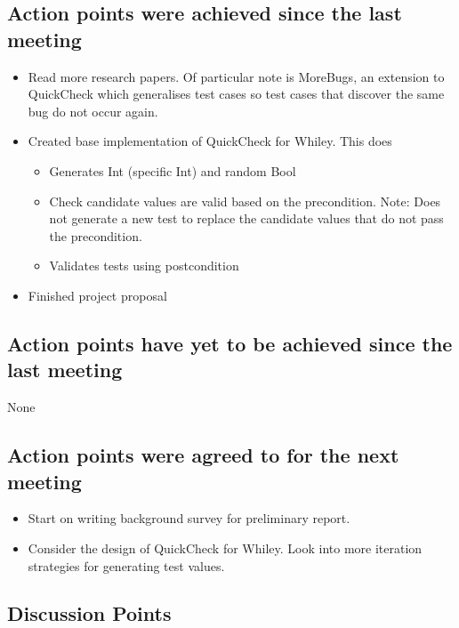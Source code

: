 \documentclass[]{article}
\begin{document}
\subsection{Action points were achieved since the last meeting}
\begin{itemize}
	\item Read more research papers. Of particular note is MoreBugs, an extension to QuickCheck which generalises test cases so test cases that discover the same bug do not occur again.
	\item Created base implementation of QuickCheck for Whiley. This does
	\begin{itemize}
		\item Generates Int (specific Int) and random Bool
		\item Check candidate values are valid based on the precondition. Note: Does not generate a new test to replace the candidate values that do not pass the precondition.
		\item Validates tests using postcondition
	\end{itemize}
	\item Finished project proposal
\end{itemize}
\subsection{Action points have yet to be achieved since the last meeting}
None
\subsection{Action points were agreed to for the next meeting}
\begin{itemize}
	\item Start on writing background survey for preliminary report.
	\item Consider the design of QuickCheck for Whiley. Look into more iteration strategies for generating test values.
\end{itemize}

\subsection{Discussion Points}
\end{document}
